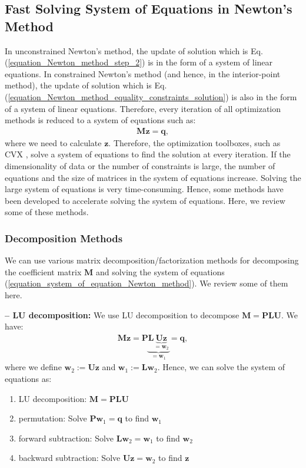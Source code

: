 \documentclass[lang=cn,10pt]{gorgeousnbook}
\numberwithin{equation}{section}%
\numberwithin{figure}{section}%
\begin{document}
\subsection{Fast Solving System of Equations in Newton's Method}

In unconstrained Newton's method, the update of solution which is Eq. (\ref{equation_Newton_method_step_2}) is in the form of a system of linear equations. 
In constrained Newton's method (and hence, in the interior-point method), the update of solution which is Eq. (\ref{equation_Newton_method_equality_constraints_solution}) is also in the form of a system of linear equations. 
Therefore, every iteration of all optimization methods is reduced to a system of equations such as:
\begin{align}\label{equation_system_of_equation_Newton_method}
\boldsymbol{M z} = \boldsymbol{q},
\end{align}
where we need to calculate $\boldsymbol{z}$.
Therefore, the optimization toolboxes, such as CVX \cite{grant2009cvx}, solve a system of equations to find the solution at every iteration. 
If the dimensionality of data or the number of constraints is large, the number of equations and the size of matrices in the system of equations increase. Solving the large system of equations is very time-consuming. Hence, some methods have been developed to accelerate solving the system of equations. Here, we review some of these methods. 

\subsubsection{Decomposition Methods}


We can use various matrix decomposition/factorization methods \cite{golub2013matrix} for decomposing the coefficient matrix $\boldsymbol{M}$ and solving the system of equations (\ref{equation_system_of_equation_Newton_method}). We review some of them here. 

\hfill\break
\textbf{-- LU decomposition:}
We use LU decomposition to decompose $\boldsymbol{M} = \boldsymbol{PLU}$. We have:
\begin{align*}
\boldsymbol{M z} = \boldsymbol{P}\underbrace{\boldsymbol{L}\underbrace{\boldsymbol{U}\boldsymbol{z}}_{=\boldsymbol{w}_2}}_{=\boldsymbol{w}_1} = \boldsymbol{q},
\end{align*}
where we define $\boldsymbol{w}_2 := \boldsymbol{U z}$ and $\boldsymbol{w}_1 := \boldsymbol{L} \boldsymbol{w}_2$. 
Hence, we can solve the system of equations as:
\begin{enumerate}
\item LU decomposition: $\boldsymbol{M} = \boldsymbol{PLU}$
\item permutation: Solve $\boldsymbol{P}\boldsymbol{w}_1 = \boldsymbol{q}$ to find $\boldsymbol{w}_1$
\item forward subtraction: Solve $\boldsymbol{L}\boldsymbol{w}_2 = \boldsymbol{w}_1$ to find $\boldsymbol{w}_2$
\item backward subtraction: Solve $\boldsymbol{U}\boldsymbol{z} = \boldsymbol{w}_2$ to find $\boldsymbol{z}$
\end{enumerate}
\end{document}
